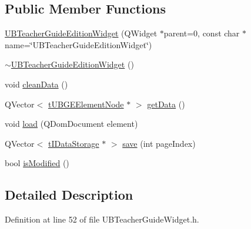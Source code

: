 \subsection*{Public Member Functions}
\begin{DoxyCompactItemize}
\item 
\hyperlink{class_u_b_teacher_guide_edition_widget_a961038ebb2833cd7d8f80e559f7805c6}{U\-B\-Teacher\-Guide\-Edition\-Widget} (Q\-Widget $\ast$parent=0, const char $\ast$name=\char`\"{}U\-B\-Teacher\-Guide\-Edition\-Widget\char`\"{})
\item 
\hyperlink{class_u_b_teacher_guide_edition_widget_a6a14b90f18252dd74814814da5bffa78}{$\sim$\-U\-B\-Teacher\-Guide\-Edition\-Widget} ()
\item 
void \hyperlink{class_u_b_teacher_guide_edition_widget_ab2043abd175667796af9df1a69a8a25b}{clean\-Data} ()
\item 
Q\-Vector$<$ \hyperlink{structt_u_b_g_e_element_node}{t\-U\-B\-G\-E\-Element\-Node} $\ast$ $>$ \hyperlink{class_u_b_teacher_guide_edition_widget_a04089872a9aaa5d538d7f858ac666978}{get\-Data} ()
\item 
void \hyperlink{class_u_b_teacher_guide_edition_widget_a72415bba1f2250f0070e81bb314db982}{load} (Q\-Dom\-Document element)
\item 
Q\-Vector$<$ \hyperlink{structt_i_data_storage}{t\-I\-Data\-Storage} $\ast$ $>$ \hyperlink{class_u_b_teacher_guide_edition_widget_adce8e3531d798822aafed4a243cceff1}{save} (int page\-Index)
\item 
bool \hyperlink{class_u_b_teacher_guide_edition_widget_a94e3cda687e93ee324bd5bd60cdd83aa}{is\-Modified} ()
\end{DoxyCompactItemize}


\subsection{Detailed Description}


Definition at line 52 of file U\-B\-Teacher\-Guide\-Widget.\-h.



